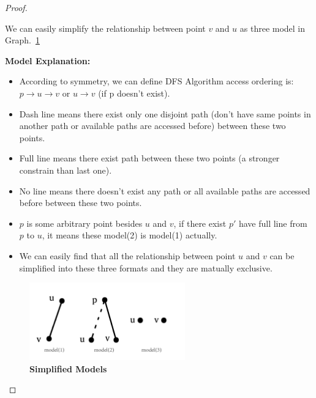 \documentclass[12pt,a4paper]{article}
\theoremstyle{definition}
\begin{document}
\begin{enumerate}
\begin{proof}
\begin{minipage}[t]{0.9\textwidth}
\begin{algorithm}[H]

        \end{algorithm}
        \end{minipage}
        \hfill
        \item
        We can easily simplify the relationship between point $v$ and $u$ as three model in Graph.~\ref{Graph1}
        
        \textbf{Model Explanation:} 
        \begin{itemize}
        \item According to symmetry, we can define DFS Algorithm access ordering is: $p \rightarrow u \rightarrow v$ or $u \rightarrow v$ (if p doesn't exist).
        \item Dash line means there exist only one disjoint path (don't have same points in another path or available paths are accessed before) between these two points. 
        \item Full line means there exist path between these two points (a stronger constrain than last one).
        \item No line means there doesn't exist any path or all available paths are accessed before between these two points.
        \item $p$ is some arbitrary point besides $u$ and $v$, if there exist $p'$ have full line from $p$ to $u$, it means these model(2) is model(1) actually.
        \item We can easily find that all the relationship between point $u$ and $v$ can be simplified into these three formats and they are matually exclusive.
        \end{itemize}
        \begin{figure}[htbp]
        \centering
        \includegraphics[width=0.6\textwidth]{pictures/pic_1.pdf}
        \caption{\textbf{Simplified Models}}\label{Graph1}
        \end{figure}\item


\end{proof}
\end{enumerate}
\end{document}

